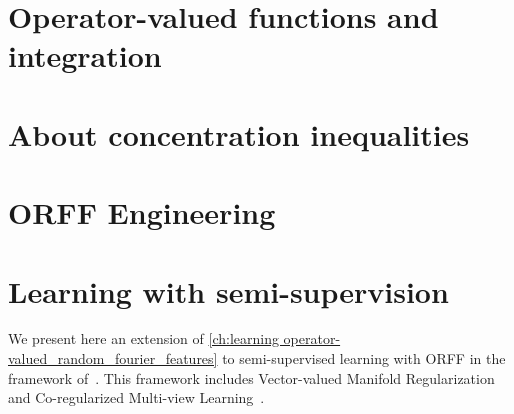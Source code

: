 
\section{Operator-valued functions and integration}

\section{About concentration inequalities}

\section{ORFF Engineering}
\section{Learning with semi-supervision}
We present here an extension of \cref{ch:learning
operator-valued_random_fourier_features} to semi-supervised learning with
\acs{ORFF} in the framework of~\citet{minh2016unifying}. This framework
includes Vector-valued Manifold
Regularization~\citep{belkin2006manifold,Brouard2011,minh2013unifying} and
Co-regularized Multi-view
Learning~\citep{brefeld2006efficient,sindhwani2008rkhs,rosenberg2009kernel,
sun2011multi}.

